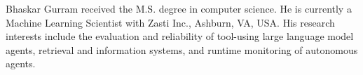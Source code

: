\documentclass{ieeeaccess}
\begin{document}



\begin{IEEEbiographynophoto}{Bhaskar Gurram}
received the M.S. degree in computer science. He is currently a Machine Learning
Scientist with Zasti Inc., Ashburn, VA, USA. His research interests include the
evaluation and reliability of tool-using large language model agents, retrieval
and information systems, and runtime monitoring of autonomous agents.
\end{IEEEbiographynophoto}

\EOD
\end{document}
